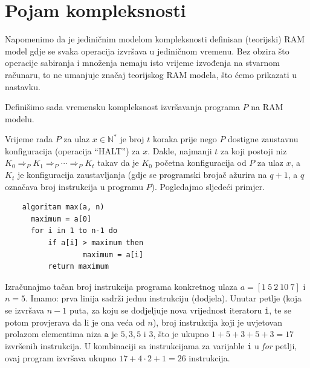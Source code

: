 \section{Pojam kompleksnosti}

Napomenimo da je jediničnim modelom kompleksnosti definisan (teorijski) RAM model gdje se svaka operacija izvršava u jediničnom vremenu.  Bez obzira što operacije sabiranja i množenja nemaju isto vrijeme izvođenja na stvarnom računaru, to ne umanjuje značaj teorijskog RAM modela, što ćemo prikazati u nastavku.   

Definišimo sada vremensku kompleksnost izvršavanja programa $P$ na RAM modelu.

\begin{definition}
	Vrijeme rada $P$ za ulaz  $x \in \mathbb{N}^*$ je broj $t$ koraka prije nego $P$ dostigne zaustavnu
	konfiguracija (operacija ``HALT'') za $x$. Dakle, najmanji $t$ za koji postoji niz $K_0 \Rightarrow_P  K_1 \Rightarrow_P \cdots \Rightarrow_P K_t$ takav da je $K_0$
	početna konfiguracija od $P$ za ulaz $x$, a $K_t$ je konfiguracija zaustavljanja (gdje se programski brojač  ažurira na $q + 1$, a $q$
	označava broj instrukcija u programu $P$).  
	Pogledajmo sljedeći primjer. 
	
\end{definition}
 
	
\begin{verbatim}
	algoritam max(a, n)
	  maximum = a[0]
 	  for i in 1 to n-1 do
	      if a[i] > maximum then
                  maximum = a[i]
          return maximum    
\end{verbatim}


Izračunajmo tačan broj instrukcija programa konkretnog ulaza $a = [1\ 5\ 2\ 10\ 7]$ i $n = 5$. Imamo: prva linija sadrži jednu instrukciju (dodjela). Unutar petlje (koja se izvršava $n-1$ puta, za koju se dodjeljuje nova  vrijednost iteratoru \texttt{i}, te se potom provjerava da li je ona veća od $n$), broj instrukcija koji je uvjetovan prolazom elementima niza  $\texttt{a}$ je $5, 3, 5$ i $3$, što je ukupno $1+5+3+5+3=17$ izvršenih instrukcija.  U kombinaciji sa instrukcijama za varijable \texttt{i} u \emph{for} petlji, ovaj program izvršava ukupno $17+ 4 \cdot 2 + 1 = 26$ instrukcija.



